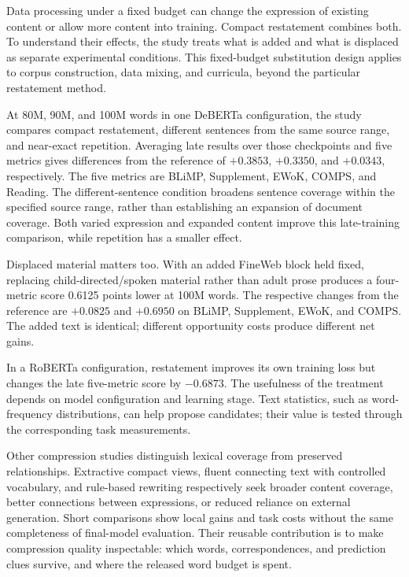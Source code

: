 Data processing under a fixed budget can change the expression of existing content or allow more content into training. Compact restatement combines both. To understand their effects, the study treats what is added and what is displaced as separate experimental conditions. This fixed-budget substitution design applies to corpus construction, data mixing, and curricula, beyond the particular restatement method.

At 80M, 90M, and 100M words in one DeBERTa configuration, the study compares compact restatement, different sentences from the same source range, and near-exact repetition. Averaging late results over those checkpoints and five metrics gives differences from the reference of $+0.3853$, $+0.3350$, and $+0.0343$, respectively. The five metrics are BLiMP, Supplement, EWoK, COMPS, and Reading. The different-sentence condition broadens sentence coverage within the specified source range, rather than establishing an expansion of document coverage. Both varied expression and expanded content improve this late-training comparison, while repetition has a smaller effect.

Displaced material matters too. With an added FineWeb block held fixed, replacing child-directed/spoken material rather than adult prose produces a four-metric score 0.6125 points lower at 100M words. The respective changes from the reference are $+0.0825$ and $+0.6950$ on BLiMP, Supplement, EWoK, and COMPS. The added text is identical; different opportunity costs produce different net gains.

In a RoBERTa configuration, restatement improves its own training loss but changes the late five-metric score by $-0.6873$. The usefulness of the treatment depends on model configuration and learning stage. Text statistics, such as word-frequency distributions, can help propose candidates; their value is tested through the corresponding task measurements.

Other compression studies distinguish lexical coverage from preserved relationships. Extractive compact views, fluent connecting text with controlled vocabulary, and rule-based rewriting respectively seek broader content coverage, better connections between expressions, or reduced reliance on external generation. Short comparisons show local gains and task costs without the same completeness of final-model evaluation. Their reusable contribution is to make compression quality inspectable: which words, correspondences, and prediction clues survive, and where the released word budget is spent.

